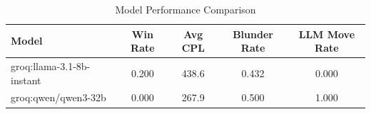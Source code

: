 \begin{table}[h]
\centering
\caption{Model Performance Comparison}
\begin{tabular}{lcccc}
\toprule
Model & Win Rate & Avg CPL & Blunder Rate & LLM Move Rate \\
\midrule
groq:llama-3.1-8b-instant & 0.200 & 438.6 & 0.432 & 0.000 \\
groq:qwen/qwen3-32b & 0.000 & 267.9 & 0.500 & 1.000 \\
\bottomrule
\end{tabular}
\end{table}